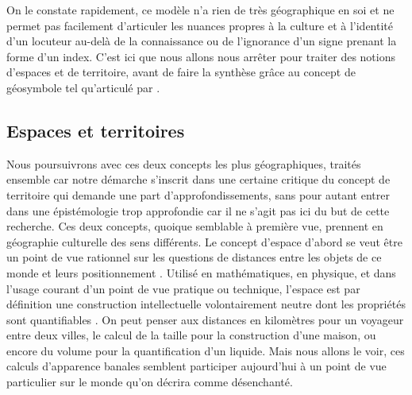 On le constate rapidement, ce modèle n'a  rien de très géographique en soi et ne permet pas facilement d'articuler les nuances propres à la culture et à l'identité d'un locuteur au-delà de la connaissance ou de l'ignorance d'un signe prenant la forme d'un index. 
C'est ici que nous allons nous arrêter pour traiter des notions d'espaces et de territoire, avant de faire la synthèse grâce au concept de géosymbole tel qu'articulé par \citet{Bonnemaison1981}.


\subsection{Espaces et territoires}
\label{sec:espaces_et_territoires} Nous poursuivrons avec ces deux concepts les plus géographiques, traités ensemble car notre démarche s'inscrit dans une certaine critique du concept de territoire qui demande une part d'approfondissements, sans pour autant entrer dans une épistémologie trop approfondie car il ne s'agit pas ici du but de cette recherche. 
Ces deux concepts, quoique semblable à première vue, prennent en géographie culturelle des sens différents. 
Le concept d'espace d'abord se veut être un point de vue rationnel sur les questions de distances entre les objets de ce monde et leurs positionnement . 
Utilisé en mathématiques, en physique, et dans l'usage courant d'un point de vue pratique ou technique, l'espace est par définition une construction intellectuelle volontairement neutre dont les propriétés sont quantifiables .
On peut penser aux distances en kilomètres pour un voyageur entre deux villes, le calcul de la taille pour la construction d'une maison, ou encore du volume pour la quantification d'un liquide. 
Mais nous allons le voir, ces calculs d'apparence banales semblent participer aujourd'hui à un point de vue particulier sur le monde qu'on décrira comme désenchanté.

